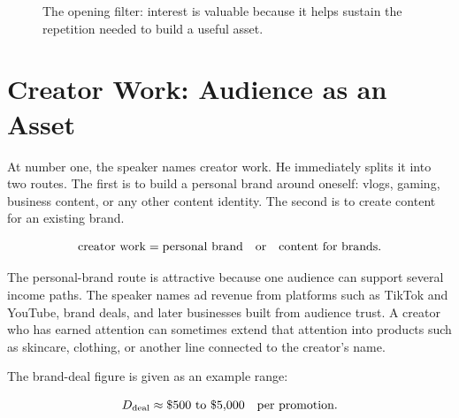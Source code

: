 \begin{figure}
\centering
{}
\caption{The opening filter: interest is valuable because it helps sustain the repetition needed to build a useful asset.}
\end{figure}

\section{Creator Work: Audience as an Asset}

At number one, the speaker names creator work. He immediately splits it into two routes. The first is to build a personal brand around oneself: vlogs, gaming, business content, or any other content identity. The second is to create content for an existing brand.

\begin{equation}
\mathrm{creator\ work}
=
\mathrm{personal\ brand}
\quad \hbox{or} \quad
\mathrm{content\ for\ brands}.
\end{equation}

The personal-brand route is attractive because one audience can support several income paths. The speaker names ad revenue from platforms such as TikTok and YouTube, brand deals, and later businesses built from audience trust. A creator who has earned attention can sometimes extend that attention into products such as skincare, clothing, or another line connected to the creator's name.

The brand-deal figure is given as an example range:

\begin{equation}
D_{\mathrm{deal}}
\approx
\$500 \hbox{ to } \$5{,}000
\quad \hbox{per promotion}.
\end{equation}

